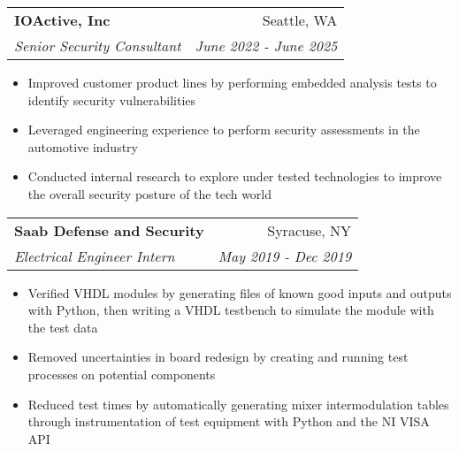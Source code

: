 \documentclass[letterpaper,11pt]{article}
\makeatletter
\newcommand{\resumeItem}[1]{
  \item\small{
    #1 \vspace{-4pt}
  }
}
\newcommand{\resumeSubheading}[4]{
  \vspace{2pt}
    \begin{tabular*}{0.97\textwidth}[t]{l@{\extracolsep{\fill}}r}
	\textbf{#1} & #2 \\
	\textit{\small#3}  & \textit{\small#4} \\
    \end{tabular*} \vspace{-5pt}
}
\newcommand{\resumeSubHeadingListStart}{\begin{itemize}[leftmargin=*]}
\newcommand{\resumeSubHeadingListEnd}{\end{itemize}}
\makeatother
\begin{document}
    \resumeSubheading
      {IOActive, Inc}{Seattle, WA}
      {Senior Security Consultant}{June 2022 - June 2025}

    \resumeSubHeadingListStart
      \resumeItem{Improved customer product lines by performing embedded analysis tests to identify security vulnerabilities}
      \resumeItem{Leveraged engineering experience to perform security assessments in the automotive industry} 
      \resumeItem{Conducted internal research to explore under tested technologies to improve the overall security posture of the tech world}
    \resumeSubHeadingListEnd

    \resumeSubheading
      {Saab Defense and Security}{Syracuse, NY}
      {Electrical Engineer Intern}{May 2019 - Dec 2019}

    \resumeSubHeadingListStart
      \resumeItem{Verified VHDL modules by generating files of known good inputs and outputs with Python, then writing a VHDL testbench to simulate the module with the test data}
      \resumeItem{Removed uncertainties in board redesign by creating and running test processes on potential components} 
      \resumeItem{Reduced test times by automatically generating mixer intermodulation tables through instrumentation of test equipment with Python and the NI VISA API}
    \resumeSubHeadingListEnd


\end{document}
